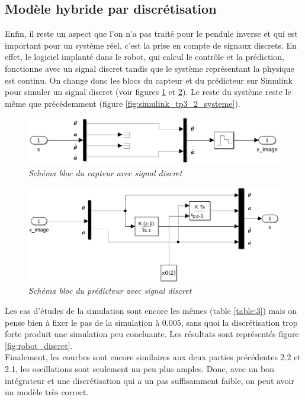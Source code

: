 \documentclass[11pt,french]{article} %
\begin{document}
\subsection{Modèle hybride par discrétisation}

\quad Enfin, il reste un aspect que l'on n'a pas traité pour le pendule inverse et qui est important pour un système réel, c'est la prise en compte de signaux discrets. En effet, le logiciel implanté dans le robot, qui calcul le contrôle et la prédiction, fonctionne avec un signal discret tandis que le système représentant la physique est continu. On change donc les blocs du capteur et du prédicteur sur Simulink pour simuler un signal discret (voir figures \ref{fig:simulink_tp3_3_capteur} et \ref{fig:simulink_tp3_3_predicteur}). Le reste du système reste le même que précédemment (figure \ref{fig:simulink_tp3_2_systeme}). \\

\begin{figure}[H]
    \centering
    \includegraphics[width=12cm]{simulink_tp3_3_capteur.png} 
		\caption{\textit{Schéma bloc du capteur avec signal discret}}
		\label{fig:simulink_tp3_3_capteur}
\end{figure}
\vspace{0.5cm}

\begin{figure}[H]
    \centering
    \includegraphics[width=12cm]{simulink_tp3_3_predicteur.png} 
		\caption{\textit{Schéma bloc du prédicteur avec signal discret}}
		\label{fig:simulink_tp3_3_predicteur}
\end{figure}
\vspace{0.5cm}

\quad Les cas d'études de la simulation sont encore les mêmes (table \ref{table:3}) mais on pense bien à fixer le pas de la simulation à $0.005$, sans quoi la discrétisation trop forte produit une simulation peu concluante. Les résultats sont représentés figure \ref{fig:robot_discret}. \\
Finalement, les courbes sont encore similaires aux deux parties précédentes 2.2 et 2.1, les oscillations sont seulement un peu plus amples. Donc, avec un bon intégrateur et une discrétisation qui a un pas suffisamment faible, on peut avoir un modèle très correct.
\end{document}
